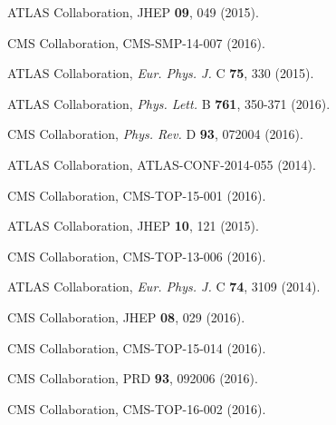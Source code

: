 \documentclass{blois}
\def\Journal#1#2#3#4{{#1} {\bf #2}, #3 (#4)}
\def\PLB{{\em Phys. Lett.}  B}
\def\PRD{{\em Phys. Rev.} D}
\def\EPJC{{\em Eur. Phys. J.} C}
\begin{document}
\begin{thebibliography}{99}

ATLAS Collaboration, \Journal{JHEP}{09}{049}{2015}.

CMS Collaboration, CMS-SMP-14-007 (2016).

ATLAS Collaboration, \Journal{\EPJC}{75}{330}{2015}.

ATLAS Collaboration, \Journal{\PLB}{761}{350-371}{2016}.

CMS Collaboration, \Journal{\PRD}{93}{072004}{2016}.

ATLAS Collaboration, ATLAS-CONF-2014-055 (2014).

CMS Collaboration, CMS-TOP-15-001 (2016).

ATLAS Collaboration, \Journal{JHEP}{10}{121}{2015}.

CMS Collaboration, CMS-TOP-13-006 (2016).

ATLAS Collaboration, \Journal{\EPJC}{74}{3109}{2014}.

CMS Collaboration, \Journal{JHEP}{08}{029}{2016}.

CMS Collaboration, CMS-TOP-15-014 (2016).

CMS Collaboration, \Journal{PRD}{93}{092006}{2016}.

CMS Collaboration, CMS-TOP-16-002 (2016).

\end{thebibliography}
\end{document}

